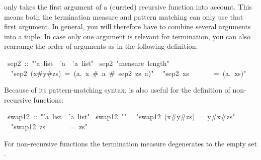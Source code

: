 \begin{isabelle}
\begin{isamarkuptext}
\begin{warn}
   only takes the first argument of a (curried)
  recursive function into account. This means both the termination measure
  and pattern matching can only use that first argument. In general, you will
  therefore have to combine several arguments into a tuple. In case only one
  argument is relevant for termination, you can also rearrange the order of
  arguments as in the following definition:
\end{warn}%
\end{isamarkuptext}%
~sep2~::~{"}'a~list~{\isasymRightarrow}~'a~{\isasymRightarrow}~'a~list{"}\isanewline
{}~sep2~{"}measure~length{"}\isanewline
~~{"}sep2~(x\#y\#zs)~=~({\isasymlambda}a.~x~\#~a~\#~sep2~zs~a){"}\isanewline
~~{"}sep2~xs~~~~~~~=~({\isasymlambda}a.~xs){"}%
\begin{isamarkuptext}%
Because of its pattern-matching syntax,  is also useful
for the definition of non-recursive functions:%
\end{isamarkuptext}%
~swap12~::~{"}'a~list~{\isasymRightarrow}~'a~list{"}\isanewline
{}~swap12~{"}{\isabraceleft}{\isabraceright}{"}\isanewline
~~{"}swap12~(x\#y\#zs)~=~y\#x\#zs{"}\isanewline
~~{"}swap12~zs~~~~~~~=~zs{"}%
\begin{isamarkuptext}%
\noindent
For non-recursive functions the termination measure degenerates to the empty
set \isa{\{\}}.%
\end{isamarkuptext}%
\end{isabelle}%
